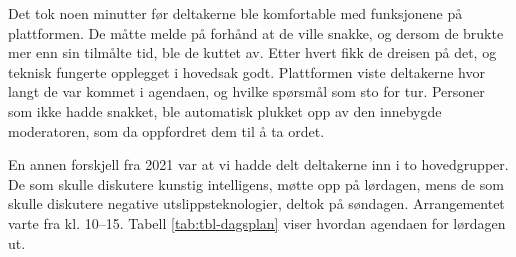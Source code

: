 \documentclass[
  12pt,
  a4paper, 12pt]{article}
\begin{document}
Det tok noen minutter før deltakerne ble komfortable med funksjonene på plattformen. De måtte melde på forhånd at de ville snakke, og dersom de brukte mer enn sin tilmålte tid, ble de kuttet av. Etter hvert fikk de dreisen på det, og teknisk fungerte opplegget i hovedsak godt. Plattformen viste deltakerne hvor langt de var kommet i agendaen, og hvilke spørsmål som sto for tur. Personer som ikke hadde snakket, ble automatisk plukket opp av den innebygde moderatoren, som da oppfordret dem til å ta ordet.

En annen forskjell fra 2021 var at vi hadde delt deltakerne inn i to hovedgrupper. De som skulle diskutere kunstig intelligens, møtte opp på lørdagen, mens de som skulle diskutere negative utslippsteknologier, deltok på søndagen. Arrangementet varte fra kl. 10--15. Tabell \ref{tab:tbl-dagsplan} viser hvordan agendaen for lørdagen ut.

\begin{table}[!h]

\caption{\label{tab:tbl-dagsplan}Dagsplan for deliberativ meningsmåling i Bergen 2021}
\centering
{}
\end{table}
\end{document}
